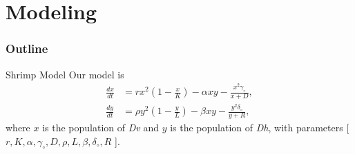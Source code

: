 
\section{Modeling}
\begin{frame}
  \frametitle{Outline}
  \tableofcontents[ currentsection ]
\end{frame}

\begin{frame}{Shrimp Model}
Our model is 
  \begin{align*}
    \frac{dx}{dt} & = rx^2 \left(1-\frac{x}{K}\right) - \alpha xy - \frac{x^2 \gamma_\circ}{x+D}, \\
    \frac{dy}{dt} & = \rho y^2 \left(1-\frac{y}{L}\right) - \beta xy -\frac{y^2 \delta_\circ}{y+R},
  \end{align*}
where $x$ is the population of \textit{Dv} and $y$ is the population of \textit{Dh}, with parameters [ $r, K, \alpha, \gamma_\circ, D, \rho, L, \beta, \delta_\circ, R$ ].
\end{frame}